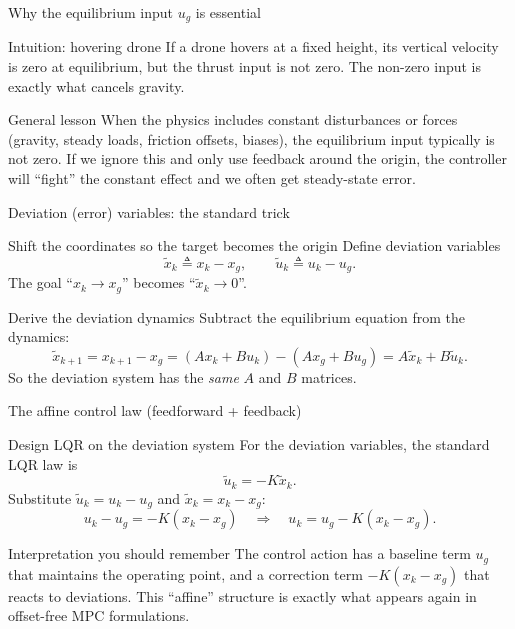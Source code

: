 \documentclass[aspectratio=169,11pt]{beamer}
\begin{document}
\begin{frame}{Why the equilibrium input $u_g$ is essential}
\begin{exampleblock}{Intuition: hovering drone}
If a drone hovers at a fixed height, its vertical velocity is zero at equilibrium, but the thrust input is not zero.
The non-zero input is exactly what cancels gravity.
\end{exampleblock}

\begin{block}{General lesson}
When the physics includes constant disturbances or forces (gravity, steady loads, friction offsets, biases), the equilibrium input typically is not zero.
If we ignore this and only use feedback around the origin, the controller will ``fight'' the constant effect and we often get steady-state error.
\end{block}
\end{frame}

\begin{frame}{Deviation (error) variables: the standard trick}
\begin{block}{Shift the coordinates so the target becomes the origin}
Define deviation variables
\[
\tilde{x}_k \triangleq x_k - x_g,\qquad \tilde{u}_k \triangleq u_k - u_g.
\]
The goal ``$x_k \to x_g$'' becomes ``$\tilde{x}_k\to 0$''.
\end{block}

\begin{block}{Derive the deviation dynamics}
Subtract the equilibrium equation from the dynamics:
\[
\tilde{x}_{k+1} = x_{k+1}-x_g = (Ax_k+Bu_k) - (Ax_g+Bu_g) = A\tilde{x}_k + B\tilde{u}_k.
\]
So the deviation system has the \emph{same} $A$ and $B$ matrices.
\end{block}
\end{frame}

\begin{frame}{The affine control law (feedforward + feedback)}
\begin{block}{Design LQR on the deviation system}
For the deviation variables, the standard LQR law is
\[
\tilde{u}_k = -K\tilde{x}_k.
\]
Substitute $\tilde{u}_k=u_k-u_g$ and $\tilde{x}_k=x_k-x_g$:
\[
u_k - u_g = -K(x_k-x_g)
\quad\Rightarrow\quad
u_k = u_g - K(x_k-x_g).
\]
\end{block}

\begin{alertblock}{Interpretation you should remember}
The control action has a baseline term $u_g$ that maintains the operating point, and a correction term $-K(x_k-x_g)$ that reacts to deviations.
This ``affine'' structure is exactly what appears again in offset-free MPC formulations.
\end{alertblock}
\end{frame}
\end{document}
